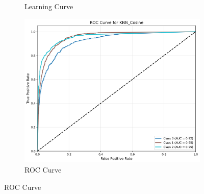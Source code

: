 \documentclass[10pt]{article}
\begin{document}
\begin{figure}[!ht]
\begin{subfigure}{0.33\textwidth}
            \caption{Learning Curve}
        \end{subfigure}
        \begin{subfigure}{0.33\textwidth}
            \centering
            \includegraphics[width=\textwidth]{code/ResultsMainAugZip/plots/Block3_Probabilistic_Experiment_I/roc_curve_KNN_Cosine.png}
            \caption{ROC Curve}
        \end{subfigure}
    \end{figure}
    
\end{document}
